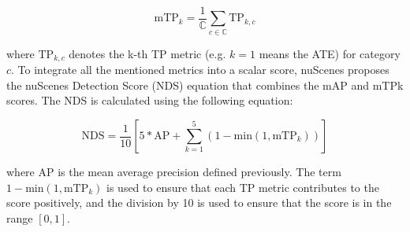 \[
    \text{mTP}_k = \frac{1}{\mathbb{C}} \sum_{c \in \mathbb{C}} \text{TP}_{k,c}
\]

where $\text{TP}_{k,c}$ denotes the k-th TP metric (e.g. $k=1$ means the ATE) for category $c$.
To integrate all the mentioned metrics into a scalar score, nuScenes proposes the nuScenes Detection Score (NDS) equation that combines the mAP and mTPk scores.
The NDS is calculated using the following equation:

\[
    \text{NDS} = \frac{1}{10} \left[5 * \text{AP} + \sum^5_{k=1}(1-\text{min}(1, \text{mTP}_k))\right]
\]

where AP is the mean average precision defined previously.
The term $1-\text{min}(1, \text{mTP}_k)$ is used to ensure that each TP metric contributes to the score positively, and the division by 10 is used to ensure that the score is in the range $[0, 1]$.

